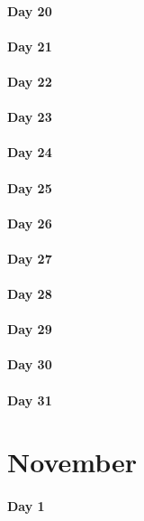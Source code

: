 \documentclass[UTF8,a4paper,8pt]{ctexart}
\begin{document}
 	 \paragraph{Day 20      \quad     }
 	 \paragraph{Day 21      \quad     }
 	 \paragraph{Day 22      \quad     }
 	 \paragraph{Day 23      \quad     }
 	 \paragraph{Day 24      \quad     }
 	 \paragraph{Day 25      \quad     }
 	 \paragraph{Day 26      \quad     }
 	 \paragraph{Day 27      \quad     }
 	 \paragraph{Day 28      \quad     }
 	 \paragraph{Day 29      \quad     }   
 	 \paragraph{Day 30      \quad     }
 	 \paragraph{Day 31      \quad     }
\section{November}
 	 \paragraph{Day 1       \quad     }
\end{document}
